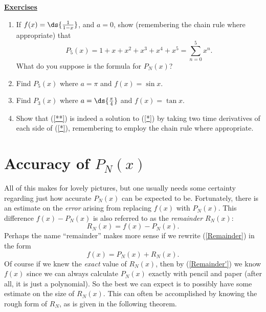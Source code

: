 \begin{center}
\underline{\Large{\bf Exercises}}
\end{center}
\begin{multicols}{2}
\begin{enumerate}
\item If $f(x)=\ds{\frac1{1-x}}$, and $a=0$,
show (remembering the chain rule where appropriate) that 
$$P_5(x)=1+x+x^2+x^3+x^4+x^5=\sum_{n=0}^5x^n.$$ 
What do you suppose is the formula for $P_N(x)$?
\item Find $P_5(x)$ where $a=\pi$ and $f(x)=\sin x.$
\item   Find $P_3(x)$ where $a=\ds{\frac\pi4}$
and $f(x)=\tan x$. \label{geompartsums} 
\item Show that (\ref{**})
is indeed a solution to (\ref{*}) by taking two time
derivatives of each side of (\ref{*}), remembering to employ the chain rule
where appropriate. 



\end{enumerate}
\end{multicols}









\newpage
\section{Accuracy of $P_N(x)$\label{AccuracyOfPN}}
\bigskip

All of this makes for lovely pictures, but one usually needs
some certainty regarding just how accurate $P_N(x)$ can be
expected to be.  Fortunately, there is an estimate on the
{\it error} arising from  replacing $f(x)$ with $P_N(x)$.
This difference $f(x)-P_N(x)$ is also referred to as the 
{\it remainder} $R_N(x)$:
\begin{equation} R_N(x)=f(x)-P_N(x).\label{Remainder}\end{equation} 
Perhaps the name ``remainder'' makes more sense if we rewrite
(\ref{Remainder}) in the form
\begin{equation}f(x)=P_N(x)+R_N(x).\label{Remainder'}\end{equation} 
Of course if we knew the {\it exact} value of $R_N(x)$, then
by (\ref{Remainder'})
we know $f(x)$ since we can always calculate $P_N(x)$
exactly with pencil and paper
(after all, it is just a polynomial).
So the best we can expect is to possibly have some estimate on the size
of $R_N(x)$.  This can often be accomplished by knowing the rough
form of $R_N$, as is given in the following theorem.

